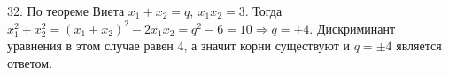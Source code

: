 32. По теореме Виета $x_1+x_2=q,\ x_1x_2=3.$ Тогда $x_1^2+x_2^2=(x_1+x_2)^2-2x_1x_2=q^2-6=10\Rightarrow q=\pm4.$ Дискриминант уравнения в этом случае равен 4, а значит корни существуют и $q=\pm4$ является ответом.\\
